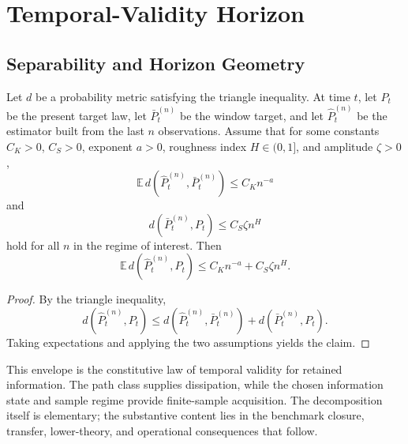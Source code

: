 \section{Temporal-Validity Horizon}
\label{sec:horizon_law}

\subsection{Separability and Horizon Geometry}\label{subsec:abstract_upper_law}

\begin{lemma}[Separability of $V$]\label{thm:abstract_upper_law}
Let $d$ be a probability metric satisfying the triangle inequality. At time $t$,
let $P_t$ be the present target law, let $\bar P_t^{(n)}$ be the window target,
and let $\widehat P_t^{(n)}$ be the estimator built from the last $n$
observations. Assume that for some constants $C_K>0$, $C_S>0$, exponent $a>0$,
roughness index $H\in(0,1]$, and amplitude $\zeta>0$,
\[
  \mathbb E\,d\!\left(\widehat P_t^{(n)},\bar P_t^{(n)}\right)
  \le C_K n^{-a}
\]
and
\[
  d\!\left(\bar P_t^{(n)},P_t\right)
  \le C_S\zeta n^H
\]
hold for all $n$ in the regime of interest. Then
\[
  \mathbb E\,d\!\left(\widehat P_t^{(n)},P_t\right)
  \le C_K n^{-a} + C_S\zeta n^H.
\]
\end{lemma}

\begin{proof}
By the triangle inequality,
\[
  d\!\left(\widehat P_t^{(n)},P_t\right)
  \le
  d\!\left(\widehat P_t^{(n)},\bar P_t^{(n)}\right)
  + d\!\left(\bar P_t^{(n)},P_t\right).
\]
Taking expectations and applying the two assumptions yields the claim.
\end{proof}

This envelope is the constitutive law of temporal validity for retained
information. The path class supplies dissipation, while the chosen information
state and sample regime provide finite-sample acquisition. The decomposition
itself is elementary; the substantive content lies in the benchmark closure,
transfer, lower-theory, and operational consequences that follow.

